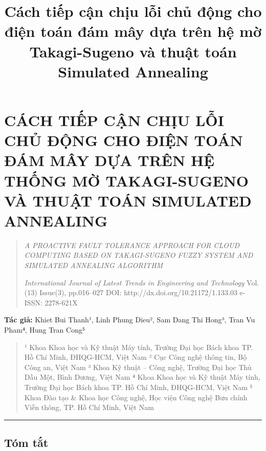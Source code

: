 \documentclass[
  vietnamese,
]{article}
\title{Cách tiếp cận chịu lỗi chủ động cho điện toán đám mây dựa trên hệ
mờ Takagi-Sugeno và thuật toán Simulated Annealing}
\author{}
\date{}
\begin{document}


\section{CÁCH TIẾP CẬN CHỊU LỖI CHỦ ĐỘNG CHO ĐIỆN TOÁN ĐÁM MÂY DỰA TRÊN
HỆ THỐNG MỜ TAKAGI-SUGENO VÀ THUẬT TOÁN SIMULATED
ANNEALING}\label{cuxe1ch-tiux1ebfp-cux1eadn-chux1ecbu-lux1ed7i-chux1ee7-ux111ux1ed9ng-cho-ux111iux1ec7n-touxe1n-ux111uxe1m-muxe2y-dux1ef1a-truxean-hux1ec7-thux1ed1ng-mux1edd-takagi-sugeno-vuxe0-thuux1eadt-touxe1n-simulated-annealing}

\begin{quote}
\emph{A PROACTIVE FAULT TOLERANCE APPROACH FOR CLOUD COMPUTING BASED ON
TAKAGI-SUGENO FUZZY SYSTEM AND SIMULATED ANNEALING ALGORITHM}

\emph{International Journal of Latest Trends in Engineering and
Technology} Vol.(13) Issue(3), pp.016--027 DOI:
http://dx.doi.org/10.21172/1.133.03 e-ISSN: 2278-621X
\end{quote}

\textbf{Tác giả:} Khiet Bui Thanh¹, Linh Phung Dieu², Sam Dang Thi
Hong³, Tran Vu Pham⁴, Hung Tran Cong⁵

\begin{quote}
¹ Khoa Khoa học và Kỹ thuật Máy tính, Trường Đại học Bách khoa TP. Hồ
Chí Minh, ĐHQG-HCM, Việt Nam ² Cục Công nghệ thông tin, Bộ Công an, Việt
Nam ³ Khoa Kỹ thuật -- Công nghệ, Trường Đại học Thủ Dầu Một, Bình
Dương, Việt Nam ⁴ Khoa Khoa học và Kỹ thuật Máy tính, Trường Đại học
Bách khoa TP. Hồ Chí Minh, ĐHQG-HCM, Việt Nam ⁵ Khoa Đào tạo \& Khoa học
Công nghệ, Học viện Công nghệ Bưu chính Viễn thông, TP. Hồ Chí Minh,
Việt Nam
\end{quote}

\begin{center}\rule{0.5\linewidth}{0.5pt}\end{center}

\subsection{Tóm tắt}\label{tuxf3m-tux1eaft}
\end{document}
